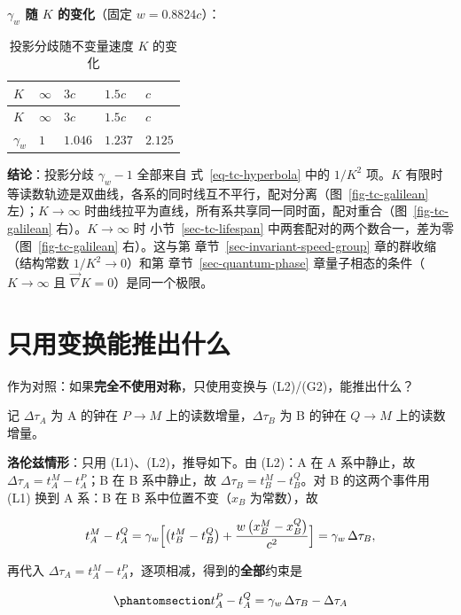 \documentclass[
  chinese,
  a4paper,
  UTF8,
  12pt,
  oneside,
  openany]{ctexbook}
\theoremstyle{plain}
\theoremstyle{plain}
\theoremstyle{plain}
\theoremstyle{definition}
\theoremstyle{plain}
\theoremstyle{plain}
\theoremstyle{remark}
\begin{document}
\textbf{\(\gamma_w\) 随 \(K\) 的变化}（固定 \(w=0.8824c\)）：

\begin{longtable}[]{@{}lllll@{}}
\caption{投影分歧随不变量速度 \(K\)
的变化}\label{tbl-tc-gamma}\tabularnewline
\toprule\noalign{}
\(K\) & \(\infty\) & \(3c\) & \(1.5c\) & \(c\) \\
\midrule\noalign{}
\endfirsthead
\toprule\noalign{}
\(K\) & \(\infty\) & \(3c\) & \(1.5c\) & \(c\) \\
\midrule\noalign{}
\endhead
\bottomrule\noalign{}
\endlastfoot
\(\gamma_w\) & \(1\) & \(1.046\) & \(1.237\) & \(2.125\) \\
\end{longtable}

\textbf{结论}：投影分歧 \(\gamma_w-1\) 全部来自 式~\ref{eq-tc-hyperbola}
中的 \(1/K^{2}\) 项。\(K\)
有限时等读数轨迹是双曲线，各系的同时线互不平行，配对分离（图~\ref{fig-tc-galilean}
左）；\(K\to\infty\)
时曲线拉平为直线，所有系共享同一同时面，配对重合（图~\ref{fig-tc-galilean}
右）。\(K\to\infty\) 时 小节~\ref{sec-tc-lifespan}
中两套配对的两个数合一，差为零（图~\ref{fig-tc-galilean} 右）。这与第
章节~\ref{sec-invariant-speed-group} 章的群收缩（结构常数
\(1/K^{2}\to0\)）和第 章节~\ref{sec-quantum-phase}
章量子相态的条件（\(K\to\infty\) 且 \(\vec\nabla K=0\)）是同一个极限。

\section{只用变换能推出什么}\label{sec-tc-only-transform}

作为对照：如果\textbf{完全不使用对称}，只使用变换与
(L2)/(G2)，能推出什么？

记 \(\Delta\tau_A\) 为 A 的钟在 \(P\to M\)
上的读数增量，\(\Delta\tau_B\) 为 B 的钟在 \(Q\to M\) 上的读数增量。

\textbf{洛伦兹情形}：只用 (L1)、(L2)，推导如下。由 (L2)：A 在 A
系中静止，故 \(\Delta\tau_A=t_A^{M}-t_A^{P}\)；B 在 B 系中静止，故
\(\Delta\tau_B=t_B^{M}-t_B^{Q}\)。对 B 的这两个事件用 (L1) 换到 A 系：B
在 B 系中位置不变（\(x_B\) 为常数），故

\[
t_A^{M}-t_A^{Q}=\gamma_w\Bigl[\bigl(t_B^{M}-t_B^{Q}\bigr)+\frac{w\,\bigl(x_B^{M}-x_B^{Q}\bigr)}{c^{2}}\Bigr]=\gamma_w\,\Delta\tau_B,
\]

再代入
\(\Delta\tau_A=t_A^{M}-t_A^{P}\)，逐项相减，得到的\textbf{全部}约束是

\begin{equation}\protect\phantomsection\label{eq-tc-key}{
t_A^{P}-t_A^{Q}=\gamma_w\,\Delta\tau_B-\Delta\tau_A
}\end{equation}
\end{document}
